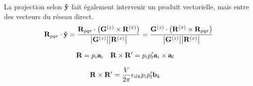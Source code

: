 \documentclass[11pt]{article}
\begin{document}
La projection selon $\vu{y}$ fait également intervenir un produit vectorielle, mais entre des vecteurs du réseau direct.
\begin{align*}
	\vb{R}_{pqr} \cdot \vu{y} = \frac{\vb{R}_{pqr} \cdot \pqty{\vb{G}^{(z)}\times \vb{R}^{(x)}}}{\abs{\vb{G}^{(z)}}\abs{\vb{R}^{(x)}}} = \frac{\vb{G}^{(z)} \cdot \pqty{ \vb{R}^{(x)} \times \vb{R}_{pqr} }}{\abs{\vb{G}^{(z)}}\abs{\vb{R}^{(x)}}}
\end{align*}

\begin{align*}
	\vb{R} &= p_i \vb{a}_i & \vb{R} \times \vb{R}^\prime &= p_i p_l^\prime \vb{a}_i \times \vb{a}_l
\end{align*}

\begin{align*}
	\vb{R} \times \vb{R}^\prime &= \frac{V}{2\pi} \epsilon_{ilk} p_i p_l^\prime \vb{b}_k
\end{align*}

\end{document}
